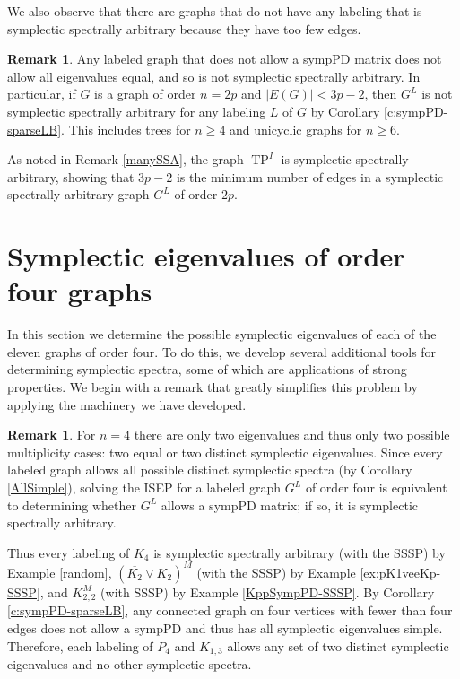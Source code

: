 \documentclass[12pt]{article}
\theoremstyle{definition}
\newtheorem{rem}[thm]{Remark}
\theoremstyle{definition}
\theoremstyle{definition}
\numberwithin{figure}{section}
\numberwithin{equation}{section}
\newcommand{\tp}{\operatorname{TP}}
\newcommand{\OL}{\overline}
\begin{document}
We also observe that there are graphs that do not have any labeling that is symplectic spectrally arbitrary because they have too few edges.

\begin{rem}\label{notSSA}
     Any labeled graph that does not allow a sympPD matrix does not allow all eigenvalues equal, and so is not symplectic spectrally arbitrary. In particular, if $G$ is a graph of order $n=2p$ and $|E(G)|<3p-2$, then $G^L$ is not symplectic spectrally arbitrary for any labeling $L$ of $G$ by Corollary \ref{c:sympPD-sparseLB}.  This includes trees for $n\ge 4$ and unicyclic graphs for $n\ge 6$.
\end{rem}



      
As noted in Remark \ref{manySSA}, the graph $\tp^I$ is symplectic spectrally arbitrary, showing  that $3p-2$ is the minimum number of edges in a symplectic spectrally arbitrary graph $G^L$ of order $2p$.


\section{Symplectic  eigenvalues of order four graphs}\label{s:order4}
In this section we determine the possible symplectic eigenvalues  of each of the eleven graphs of order four.  To do this, we develop several additional tools for determining symplectic spectra, some of which are applications of strong properties. We begin with a remark that greatly simplifies this problem by applying the machinery we have developed. 


\begin{rem}\label{o4sympPD3SSA}
    For $n=4$ there are only two eigenvalues and thus only two possible multiplicity cases: two equal or two distinct symplectic eigenvalues.  Since every labeled graph allows all possible distinct symplectic spectra (by Corollary \ref{AllSimple}), solving the ISEP for a labeled graph $G^L$ of order four is equivalent to determining whether $G^L$ allows a sympPD matrix; if so, it is symplectic spectrally arbitrary. 

Thus  every labeling of    $K_4$ is symplectic spectrally arbitrary {(with the SSSP)} by Example \ref{random}, $ ({\OL{K_2}}\vee K_2)^{M}$ (with the SSSP) by Example \ref{ex:pK1veeKp-SSSP}, and $K_{2,2}^{M}$  (with SSSP) by Example \ref{KppSympPD-SSSP}. 
By Corollary \ref{c:sympPD-sparseLB}, any connected graph on four vertices with fewer than four  edges does not allow a sympPD and thus has all symplectic eigenvalues simple.  Therefore, each labeling of $P_4$ and $K_{1,3}$ allows any set of two distinct symplectic eigenvalues and no other symplectic spectra.
\end{rem}
\end{document}
